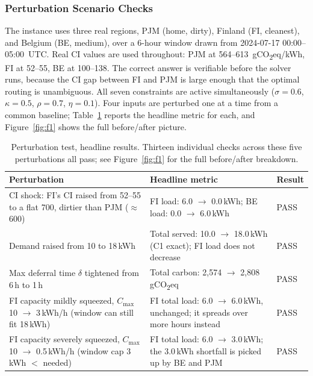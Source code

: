 \documentclass[11pt, a4paper]{article}
\begin{document}
\subsubsection{Perturbation Scenario Checks}

The instance uses three real regions, PJM (home, dirty), Finland (FI, cleanest), and Belgium (BE, medium), over a 6-hour window drawn from 2024-07-17 00:00--05:00~UTC. Real CI values are used throughout: PJM at 564--613~gCO\textsubscript{2}eq/kWh, FI at 52--55, BE at 100--138. The correct answer is verifiable before the solver runs, because the CI gap between FI and PJM is large enough that the optimal routing is unambiguous. All seven constraints are active simultaneously ($\sigma=0.6$, $\kappa=0.5$, $\rho=0.7$, $\eta=0.1$). Four inputs are perturbed one at a time from a common baseline; Table~\ref{tab:perturbation} reports the headline metric for each, and Figure~\ref{fig:f1} shows the full before/after picture.

\begin{table}[h]
\centering\small
\renewcommand{\arraystretch}{1.3}
\begin{tabularx}{\linewidth}{Xp{3.6cm}p{1.6cm}}
\toprule
\textbf{Perturbation} & \textbf{Headline metric} & \textbf{Result} \\
\midrule
CI shock: FI's CI raised from 52--55 to a flat 700, dirtier than PJM ($\approx$600) & FI load: 6.0 $\to$ 0.0\,kWh; BE load: 0.0 $\to$ 6.0\,kWh & PASS \\
Demand raised from 10 to 18\,kWh & Total served: 10.0 $\to$ 18.0\,kWh (C1 exact); FI load does not decrease & PASS \\
Max deferral time $\delta$ tightened from 6\,h to 1\,h & Total carbon: 2{,}574 $\to$ 2{,}808\,gCO\textsubscript{2}eq & PASS \\
FI capacity mildly squeezed, $C_{\max}$ 10 $\to$ 3\,kWh/h (window can still fit 18\,kWh) & FI total load: 6.0 $\to$ 6.0\,kWh, unchanged; it spreads over more hours instead & PASS \\
FI capacity severely squeezed, $C_{\max}$ 10 $\to$ 0.5\,kWh/h (window cap 3\,kWh $<$ needed) & FI total load: 6.0 $\to$ 3.0\,kWh; the 3.0\,kWh shortfall is picked up by BE and PJM & PASS \\
\bottomrule
\end{tabularx}
\caption{Perturbation test, headline results. Thirteen individual checks across these five perturbations all pass; see Figure~\ref{fig:f1} for the full before/after breakdown. \label{tab:perturbation}}
\end{table}
\end{document}
